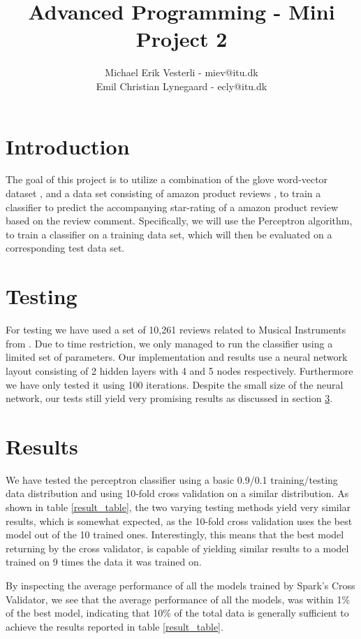 \documentclass[a4paper]{article}
\title{Advanced Programming -{} Mini Project 2}
\author{Michael Erik Vesterli -{} miev@itu.dk\\
Emil Christian Lynegaard -{} ecly@itu.dk
}
\begin{document}
\maketitle
\section{Introduction}
The goal of this project is to utilize a combination of the glove word-vector dataset \citep{glove}, and a data set consisting of amazon product reviews \citep{amazon}, to train a classifier to predict the accompanying star-rating of a amazon product review based on the review comment. Specifically, we will use the Perceptron algorithm\citep{perceptron}, to train a classifier on a training data set, which will then be evaluated on a corresponding test data set.

\section{Testing}
For testing we have used a set of 10,261 reviews related to Musical Instruments from \cite{amazon}. Due to time restriction, we only managed to run the classifier using a limited set of parameters. Our implementation and results use a neural network layout consisting of 2 hidden layers with 4 and 5 nodes respectively. Furthermore we have only tested it using 100 iterations. Despite the small size of the neural network, our tests still yield very promising results as discussed in section \ref{sec:results}.

\section{Results}\label{sec:results}
We have tested the perceptron classifier using a basic 0.9/0.1 training/testing data distribution and using 10-fold cross validation on a similar distribution. As shown in table \ref{result_table}, the two varying testing methods yield very similar results, which is somewhat expected, as the 10-fold cross validation uses the best model out of the 10 trained ones. Interestingly, this means that the best model returning by the cross validator, is capable of yielding similar results to a model trained on 9 times the data it was trained on.

By inspecting the average performance of all the models trained by Spark's Cross Validator, we see that the average performance of all the models, was within 1\% of the best model, indicating that 10\% of the total data is generally sufficient to achieve the results reported in table \ref{result_table}.
\end{document}
